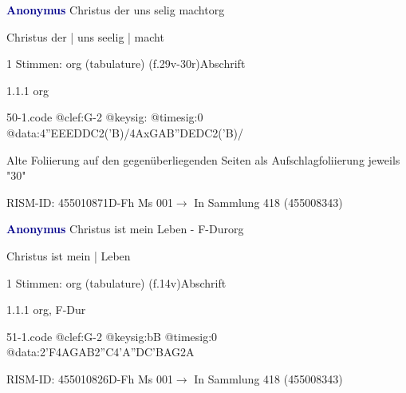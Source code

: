\documentclass[twocolumn]{book}
\begin{document}
\par \vspace{7pt} \textcolor{darkblue}{\textbf{Anonymus  }}\hfillplus{\textbf{[50]}}\newline Christus der uns selig macht\newline org
\par \begin{itshape}[f.29v, at left:] Christus der | uns seelig | macht\end{itshape} 
\par \textcolor{darkblue}{}  1 Stimmen: org (tabulature)  (f.29v-30r)\newline Abschrift
\par 1.1.1  org  
\begin{filecontents*}{50-1.code}
@clef:G-2
@keysig:
@timesig:0
@data:4''EEEDDC2('B)/4AxGAB''DEDC2('B)/
\end{filecontents*}
\newline
%
\par Alte Foliierung auf den gegenüberliegenden Seiten als Aufschlagfoliierung jeweils "30"
\par RISM-ID: 455010871\newline D-Fh  Ms 001\newline $\rightarrow$ In Sammlung 418 (455008343)
      
\par \vspace{7pt} \textcolor{darkblue}{\textbf{Anonymus  }}\hfillplus{\textbf{[51]}}\newline Christus ist mein Leben - F-Dur\newline org
\par \begin{itshape}[f.14v, at left:] Christus ist mein | Leben\end{itshape} 
\par \textcolor{darkblue}{}  1 Stimmen: org (tabulature)  (f.14v)\newline Abschrift
\par 1.1.1  org, F-Dur  
\begin{filecontents*}{51-1.code}
@clef:G-2
@keysig:bB
@timesig:0
@data:2'F4AGAB2''C4'A''DC'BAG2A
\end{filecontents*}
\newline
%
\par RISM-ID: 455010826\newline D-Fh  Ms 001\newline $\rightarrow$ In Sammlung 418 (455008343)
      
\end{document}
